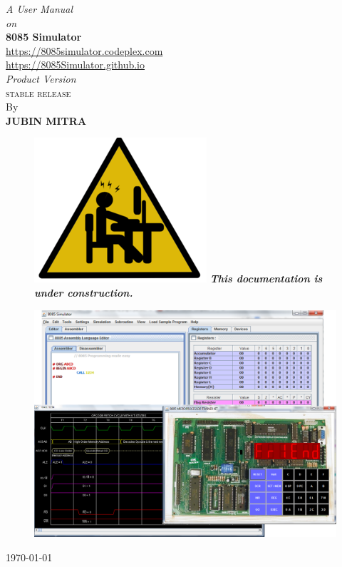 \thispagestyle{empty}

\begin{center}
\vspace{0.03\textheight}
\textit{A User Manual\\}
\vspace{0.01\textheight}
\textit{on\\}
\vspace{0.03\textheight}
{\Huge\textbf{8085 Simulator
}}\\
{\url{https://8085simulator.codeplex.com}}\\
{\url{https://8085Simulator.github.io}}\\
\vspace{0.015\textheight}
\textit{Product Version \ver}\\
\textsc{stable release}
\vspace{0.015\textheight}
\\By\\
\textbf{\textsc{JUBIN MITRA}}\\
\begin{figure}[htbp]
\centering
\includegraphics[width=0.1\linewidth]{construction}
\textit{\textbf{ This documentation is under construction.}}
\end{figure} 
\vspace{0.03\textheight}
\begin{figure}[H]
\centering

\includegraphics[width=\linewidth]{"./top_page1"}
\end{figure}
\today
\end{center}


